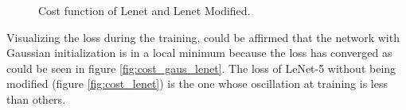 \begin{figure}[htb]
    \caption{Cost function of Lenet and Lenet Modified.} \label{fig:CostModLeNet}
\end{figure}

Visualizing the loss during the training, could be affirmed that the network with Gaussian initialization is in a local minimum because the loss has converged as could be seen in figure \ref{fig:cost_gaus_lenet}. The loss of LeNet-5 without being modified (figure  \ref{fig:cost_lenet}) is the one whose oscillation at training is less than others.

